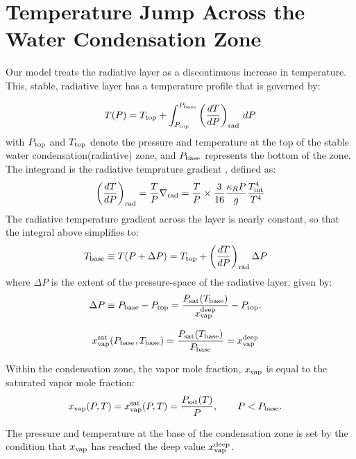 \documentclass[11pt]{ucscthesisbs}
\begin{document}
\section{Temperature Jump Across the Water Condensation Zone}
Our model treats the radiative layer as a discontinuous increase in temperature. This, stable, radiative layer has a temperature profile that is governed by:

\begin{equation}
  T(P) = T_{\rm top} + \int_{P_{\rm top}}^{P_{\rm base}} \left(\frac{dT}{dP}\right)_{\rm rad}\,d P
\end{equation}
with $P_{\rm top}$ and $T_{\rm top}$ denote the pressure and temperature at the top of the stable water condensation(radiative) zone, and $P_{\rm base}$ represents the bottom of the zone. The integrand is the radiative temprature gradient \citep{leconte_2017}, defined as:
\begin{align}
  \left(\frac{dT}{dP}\right)_{\rm rad}=\frac{T}{P}\nabla_{\rm rad}
  = \frac{T}{P}\times\frac{3}{16}\frac{\kappa_R P}{g}\frac{T_{\rm int}^4}{T^4}
\end{align}
The radiative temperature gradient across the layer is nearly constant, so that the integral above simplifies to:
\begin{align}
T_{\rm base}\equiv T(P+\Delta P) &= T_{\rm top} + \left(\frac{dT}{dP}\right)_{\rm rad}\Delta P
\end{align}
where $\Delta P$ is the extent of the pressure-space of the radiative layer, given by:
\begin{align}
\Delta P \equiv P_{\rm base}-P_{\rm top} &= \frac{P_{\rm sat}(T_{\rm base})}{x_{\rm vap}^{\rm deep}} - P_{\rm top}.
\end{align}

\begin{align}
x_{\rm vap}^{\rm sat}(P_{\rm base}, T_{\rm base}) &= \frac{P_{\rm sat}(T_{\rm base})}{P_{\rm base}}=x_{\rm vap}^{\rm deep}
\end{align}

Within the condensation zone, the vapor mole fraction, $x_{\rm vap}$ is equal to the saturated vapor mole fraction:
\begin{align}
x_{\rm vap}(P, T) &= x_{\rm vap}^{\rm sat}(P, T) = \frac{P_{\rm sat}(T)}{P}, \qquad P<P_{\rm base}.
\end{align}

The pressure and temperature at the base of the condensation zone is set by the condition that $x_{\rm vap}$ has reached the deep value $x_{\rm vap}^{\rm deep}$.
\end{document}
